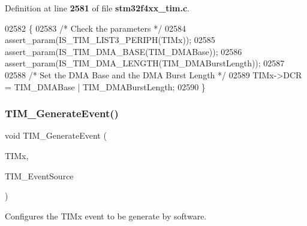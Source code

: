 Definition at line \textbf{ 2581} of file \textbf{ stm32f4xx\+\_\+tim.\+c}.


\begin{DoxyCode}
02582 \{
02583   \textcolor{comment}{/* Check the parameters */}
02584   assert_param(IS_TIM_LIST3_PERIPH(TIMx));
02585   assert_param(IS_TIM_DMA_BASE(TIM\_DMABase)); 
02586   assert_param(IS_TIM_DMA_LENGTH(TIM\_DMABurstLength));
02587 
02588   \textcolor{comment}{/* Set the DMA Base and the DMA Burst Length */}
02589   TIMx->DCR = TIM\_DMABase | TIM\_DMABurstLength;
02590 \}
\end{DoxyCode}
\mbox{\label{group__TIM__Group5_ga38bd4ffda920dd4f7655a0a2c6100a6e}} 
\subsubsection{T\+I\+M\+\_\+\+Generate\+Event()}
{\footnotesize\ttfamily void T\+I\+M\+\_\+\+Generate\+Event (\begin{DoxyParamCaption}\item[{\textbf{ T\+I\+M\+\_\+\+Type\+Def} $\ast$}]{T\+I\+Mx,  }\item[{uint16\+\_\+t}]{T\+I\+M\+\_\+\+Event\+Source }\end{DoxyParamCaption})}



Configures the T\+I\+Mx event to be generate by software. 


